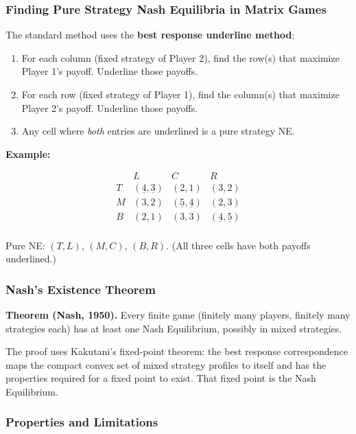 \documentclass[hidelinks]{article}
\begin{document}
\subsubsection{Finding Pure Strategy Nash Equilibria in Matrix Games}

The standard method uses the \textbf{best response underline method}:

\begin{enumerate}
    \item For each column (fixed strategy of Player 2), find the row(s) that maximize Player 1's payoff. Underline those payoffs.
    \item For each row (fixed strategy of Player 1), find the column(s) that maximize Player 2's payoff. Underline those payoffs.
    \item Any cell where \textit{both} entries are underlined is a pure strategy NE.
\end{enumerate}

\textbf{Example:}

\[
\begin{array}{c|ccc}
 & L & C & R \\
\hline
T & (\underline{4},\underline{3}) & (2,1) & (3,2) \\
M & (3,2) & (\underline{5},\underline{4}) & (2,3) \\
B & (2,1) & (3,3) & (\underline{4},\underline{5}) \\
\end{array}
\]

Pure NE: $(T,L)$, $(M,C)$, $(B,R)$. (All three cells have both payoffs underlined.)

\subsubsection{Nash's Existence Theorem}

\textbf{Theorem (Nash, 1950).} Every finite game (finitely many players, finitely many strategies each) has at least one Nash Equilibrium, possibly in mixed strategies.

The proof uses Kakutani's fixed-point theorem: the best response correspondence maps the compact convex set of mixed strategy profiles to itself and has the properties required for a fixed point to exist. That fixed point is the Nash Equilibrium.

\subsubsection{Properties and Limitations}
\end{document}
